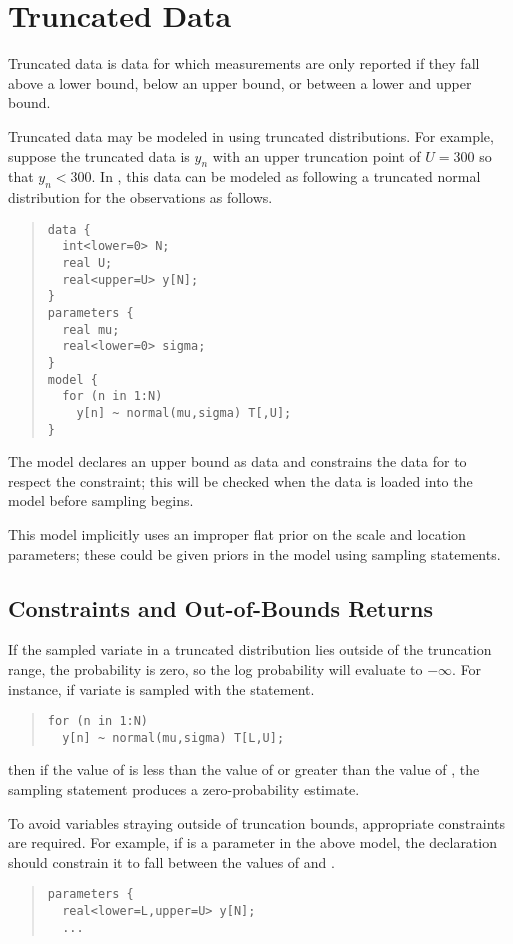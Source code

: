\section{Truncated Data}\label{truncated-data.section}

Truncated data is data for which measurements are only reported if
they fall above a lower bound, below an upper bound, or between a
lower and upper bound.  

Truncated data may be modeled in \Stan using truncated distributions.
For example, suppose the truncated data is $y_n$ with an upper
truncation point of $U = 300$ so that $y_n < 300$.  In \Stan, this
data can be modeled as following a truncated normal distribution for
the observations as follows. 
%
\begin{quote}
\begin{Verbatim}[fontsize=\small]
data {
  int<lower=0> N;
  real U;
  real<upper=U> y[N];
} 
parameters {
  real mu;
  real<lower=0> sigma;
} 
model {
  for (n in 1:N)
    y[n] ~ normal(mu,sigma) T[,U];
}
\end{Verbatim}
\end{quote}
% 
The model declares an upper bound  as data and constrains
the data for  to respect the constraint;  this will be checked
when the data is loaded into the model before sampling begins.

This model implicitly uses an improper flat prior on the scale and
location parameters; these could be given priors in the model using
sampling statements.

\subsection{Constraints and Out-of-Bounds Returns}

If the sampled variate in a truncated distribution lies outside of
the truncation range, the probability is zero, so the log probability
will evaluate to $-\infty$.  For instance, if variate  is
sampled with the statement.
%
\begin{quote}
\begin{Verbatim}[fontsize=\small]
for (n in 1:N) 
  y[n] ~ normal(mu,sigma) T[L,U];
\end{Verbatim}
\end{quote}
%
then if the value of  is less than the value of 
or greater than the value of , the sampling statement produces
a zero-probability estimate.

To avoid variables straying outside of truncation bounds, appropriate
constraints are required.  For example, if  is a parameter in
the above model, the declaration should constrain it to fall between
the values of  and .
%
\begin{quote}
\begin{Verbatim}[fontsize=\small]
parameters {
  real<lower=L,upper=U> y[N];
  ...
\end{Verbatim}
\end{quote}

